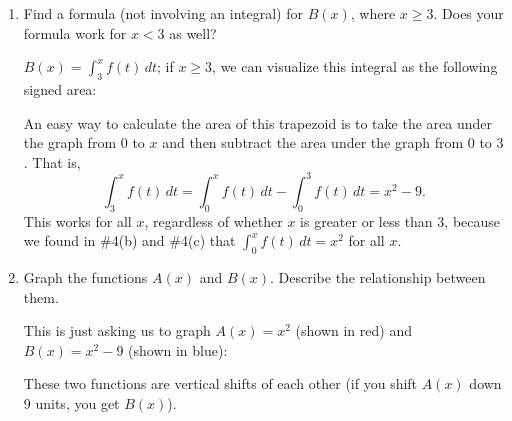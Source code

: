 \documentclass{article}
\begin{document}
\begin{enumerate}
\begin{enumerate}
  \item
    \begin{problem}[\stretch{2}]
      Find a formula (not involving an integral) for $B(x)$, where $x
      \ge 3$. Does your formula work for $x < 3$ as well?
    \end{problem}

    \begin{solution}
      $B(x) = \displaystyle \int_3^x f(t)\,dt$; if $x \geq 3$, we can
      visualize this integral as the following signed area:
      \begin{center}
      \end{center}
      An easy way to calculate the area of this trapezoid is to take the
      area under the graph from $0$ to $x$ and then subtract the area
      under the graph from $0$ to $3$.  That is, 
      \[ \int_3^x f(t)\,dt = \int_0^x f(t)\,dt - \int_0^3 f(t)\,dt =
      \boxed{x^2 - 9}.\] This works for all $x$, regardless of whether $x$
      is greater or less than $3$, because we found in
      {{{{\#4}}(b)}} and
      {{{{\#4}}(c)}} that $\displaystyle
      \int_0^x f(t)\,dt = x^2$ for all $x$.
    \end{solution}

  \item
    \begin{problem}[\stretch{2}]
      Graph the functions $A(x)$ and $B(x)$.  Describe the
      relationship between them.
    \end{problem}

    \begin{solution}
      This is just asking us to graph $A(x) = x^2$ (shown in red) and
      $B(x) = x^2 - 9$ (shown in blue):
      \begin{center}
      \end{center}
      These two functions are vertical shifts of each other (if you shift
      $A(x)$ down 9 units, you get $B(x)$).
    \end{solution}


\end{enumerate}
\end{enumerate}
\end{document}
